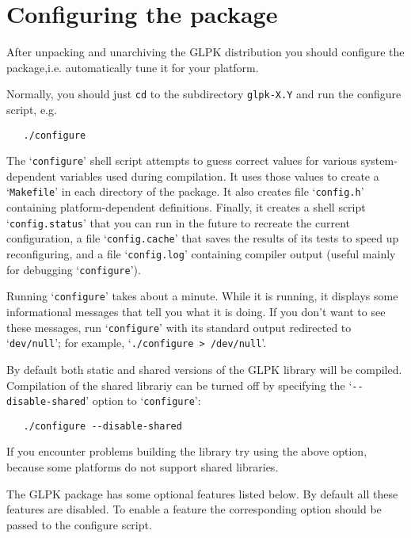 \newpage

\section{Configuring the package}

After unpacking and unarchiving the GLPK distribution you should
configure the package,\linebreak i.e. automatically tune it for your
platform.

Normally, you should just \verb|cd| to the subdirectory \verb|glpk-X.Y|
and run the configure script, e.g.

\begin{verbatim}
   ./configure
\end{verbatim}

The `\verb|configure|' shell script attempts to guess correct values
for various system-dependent variables used during compilation. It uses
those values to create a `\verb|Makefile|' in each directory of the
package. It also creates file `\verb|config.h|' containing
platform-dependent definitions. Finally, it creates a shell script
`\verb|config.status|' that you can run in the future to recreate the
current configuration, a file `\verb|config.cache|' that saves the
results of its tests to speed up reconfiguring, and a file
`\verb|config.log|' containing compiler output (useful mainly for
debugging `\verb|configure|').

Running `\verb|configure|' takes about a minute. While it is running,
it displays some informational messages that tell you what it
is doing. If you don't want to see these messages, run
`\verb|configure|' with its standard output redirected to
`\verb|dev/null|'; for example, `\verb|./configure > /dev/null|'.

By default both static and shared versions of the GLPK library will be
compiled. Compilation of the shared librariy can be turned off by
specifying the `\verb|--disable-shared|' option to `\verb|configure|':

\begin{verbatim}
   ./configure --disable-shared
\end{verbatim}

\noindent
If you encounter problems building the library try using the above
option, because some platforms do not support shared libraries.

The GLPK package has some optional features listed below. By default
all these features are disabled. To enable a feature the corresponding
option should be passed to the configure script.

